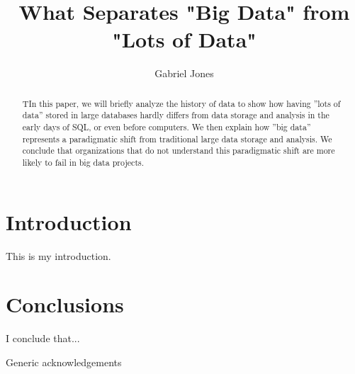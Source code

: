\documentclass[sigconf]{acmart}
\begin{document}
\title{What Separates "Big Data" from "Lots of Data"}


\author{Gabriel Jones}

\renewcommand{\shortauthors}{G. Jones}


\begin{abstract}
TIn this paper, we will briefly analyze the history of data to show how having ''lots of data'' stored in large databases hardly differs from data storage and analysis in the early days of SQL, or even before computers. We then explain how ''big data'' represents a paradigmatic shift from traditional large data storage and analysis. We conclude that organizations that do not understand this paradigmatic shift are more likely to fail in big data projects.
\end{abstract}



\maketitle

\section{Introduction}
This is my introduction.
\cite{Keystone}

\section{Conclusions}
I conclude that...



\begin{acks}

Generic acknowledgements

\end{acks}


 
\end{document}
